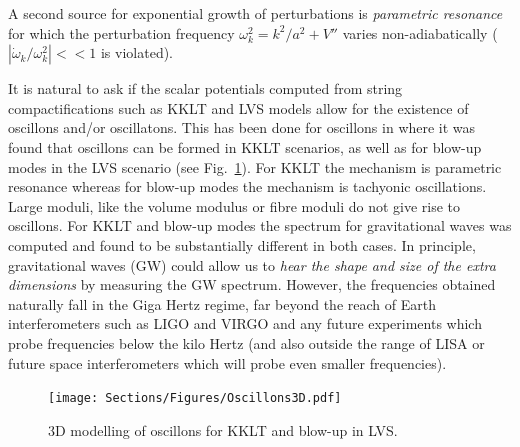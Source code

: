 A second source for exponential growth of perturbations is {\it parametric resonance} for which the perturbation frequency $\omega^2_k=k^2/a^2+V''$ varies non-adiabatically ($|\dot\omega_k/\omega_k^2|<<1 $ is violated).

It is natural to ask if the scalar potentials computed from string compactifications such as KKLT and LVS models allow for the existence of oscillons and/or oscillatons. This has been done for oscillons in \cite{Antusch:2017flz} where it was found that oscillons can be formed in KKLT scenarios, as well as for blow-up modes in the LVS scenario (see Fig.~\ref{fig:Oscillons2}). For KKLT the mechanism is parametric resonance whereas for blow-up modes the mechanism is tachyonic oscillations. Large moduli, like the volume modulus or fibre moduli do not give rise to oscillons. For KKLT and blow-up modes the spectrum for gravitational waves was computed and found to be substantially different in both cases. In principle, gravitational waves (GW) could allow us to {\it hear the shape and size of the extra dimensions} by measuring the GW spectrum. However, the frequencies obtained naturally fall in the Giga Hertz regime, far beyond the reach of Earth interferometers such as LIGO and VIRGO and any future experiments which probe frequencies below the kilo Hertz (and also outside the range of LISA \cite{amaroseoane2017laser} or future space interferometers which will probe even smaller frequencies). 
\begin{figure}[ht]
    \centering
    \texttt{[image: Sections/Figures/Oscillons3D.pdf]} 
    \caption{3D modelling of oscillons for KKLT and blow-up in LVS.}
    \label{fig:Oscillons2}
\end{figure}

